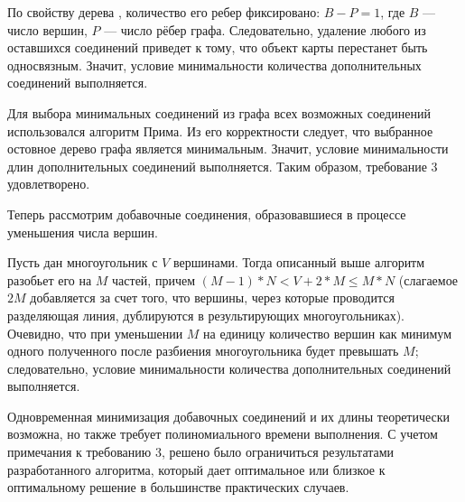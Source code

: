 По свойству дерева \cite{__2010}, количество его ребер фиксировано: $B-P=1$, где $B$ — число вершин, $P$ — число рёбер графа. Следовательно, удаление любого из оставшихся соединений приведет к тому, что объект карты перестанет быть односвязным. Значит, условие минимальности количества дополнительных соединений выполняется.

Для выбора минимальных соединений из графа всех возможных соединений использовался алгоритм Прима. Из его корректности \cite{prim_shortest_1957} следует, что выбранное остовное дерево графа является минимальным. Значит, условие минимальности длин дополнительных соединений выполняется. Таким образом, требование 3 удовлетворено.

Теперь рассмотрим добавочные соединения, образовавшиеся в процессе уменьшения числа вершин.

Пусть дан многоугольник с $V$ вершинами. Тогда описанный выше алгоритм разобьет его на $M$ частей, причем $(M-1)*N < V+2*M \leq M*N$ (слагаемое $2M$ добавляется за счет того, что вершины, через которые проводится разделяющая линия, дублируются в результирующих многоугольниках). Очевидно, что при уменьшении $M$ на единицу количество вершин как минимум одного полученного после разбиения многоугольника будет превышать $M$; следовательно, условие минимальности количества дополнительных соединений выполняется.

Одновременная минимизация добавочных соединений и их длины теоретически возможна, но также требует полиномиального времени выполнения. С учетом примечания к требованию 3, решено было ограничиться результатами разработанного алгоритма, который дает оптимальное или близкое к оптимальному решение в большинстве практических случаев.